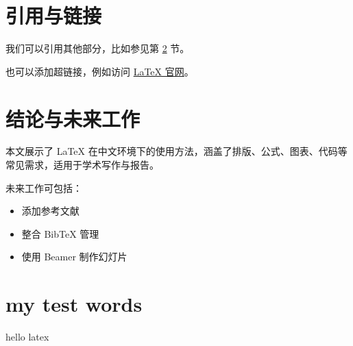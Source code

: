 \documentclass[12pt]{article}
\begin{document}
\section{引用与链接}
我们可以引用其他部分，比如参见第 \ref{sec:conclusion} 节。

也可以添加超链接，例如访问 \href{https://www.latex-project.org}{LaTeX 官网}。

\section{结论与未来工作} \label{sec:conclusion}
本文展示了 LaTeX 在中文环境下的使用方法，涵盖了排版、公式、图表、代码等常见需求，适用于学术写作与报告。

未来工作可包括：
\begin{itemize}
    \item 添加参考文献
    \item 整合 BibTeX 管理
    \item 使用 Beamer 制作幻灯片
\end{itemize}

\section{my test words}
hello latex
\end{document}
